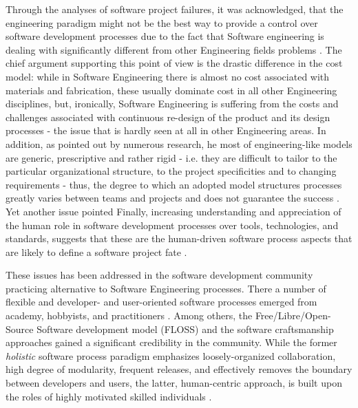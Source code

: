 Through the analyses of software project failures, it was acknowledged, that the engineering 
paradigm might not be the best way to provide a control over software development processes 
due to the fact that Software engineering is dealing with significantly different from other 
Engineering fields problems \cite{citeulike:3729379} \cite{citeulike:5203446} \cite{citeulike:2207657}.
The chief argument supporting this point of view is the drastic difference in the cost model:
while in Software Engineering there is almost no cost associated with materials and 
fabrication, these usually dominate cost in all other Engineering disciplines, but, 
ironically, Software Engineering is suffering from the costs and challenges associated with 
continuous re-design of the product and its design processes - the issue that is 
hardly seen at all in other Engineering areas. 
In addition, as pointed out by numerous research,  he most of engineering-like models are 
generic, prescriptive and rather rigid - i.e. they are difficult to tailor to the 
particular organizational structure, to the project specificities and to changing requirements -
thus, the degree to which an adopted model structures processes greatly varies between teams and 
projects and does not guarantee the success \cite{sacchi_2001}. Yet another issue pointed 
Finally, increasing understanding and appreciation of the human role in software development 
processes over tools, technologies, and standards, suggests that these are the human-driven 
software process aspects that are likely to define a software project fate 
\cite{citeulike:6580825} \cite{citeulike:149387} \cite{1605185}
 \cite{citeulike:113403} \cite{citeulike:12743107}. 

These issues has been addressed in the software development community practicing alternative 
to Software Engineering processes. There a number of flexible and developer- and user-oriented 
software processes emerged from academy, hobbyists, and practitioners \cite{citeulike:3729379}. 
Among others, the Free/Libre/Open-Source Software development model (FLOSS) and the 
software craftsmanship  approaches gained a significant credibility in the community. 
While the former \textit{holistic} software process paradigm emphasizes loosely-organized 
collaboration, high degree of modularity, frequent releases, and effectively removes the boundary 
between developers and users, the latter, human-centric approach, is built upon the roles of highly 
motivated skilled individuals \cite{citeulike:262020} \cite{citeulike:2759198}. 

